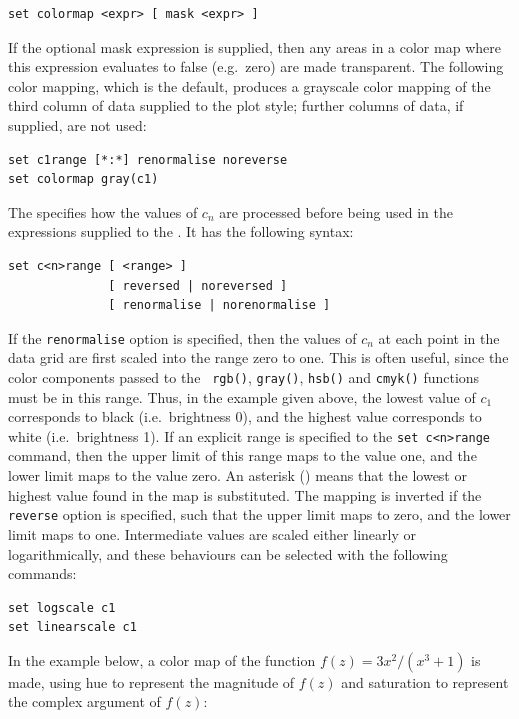 \begin{verbatim}
set colormap <expr> [ mask <expr> ]
\end{verbatim}

\noindent If the optional mask expression is supplied, then any areas in a
color map where this expression evaluates to false (e.g.\ zero) are made
transparent. The following color mapping, which is the default, produces a
grayscale color mapping of the third column of data supplied to the
 plot style; further columns of data, if supplied, are not
used:

\begin{verbatim}
set c1range [*:*] renormalise noreverse
set colormap gray(c1)
\end{verbatim}

The  specifies how the values of $c_n$ are
processed before being used in the expressions supplied to the . It has the following syntax:

\begin{verbatim}
set c<n>range [ <range> ]
              [ reversed | noreversed ]
              [ renormalise | norenormalise ]
\end{verbatim}

\noindent If the {\tt renor\-malise} option is specified, then the values of
$c_n$ at each point in the data grid are first scaled into the range zero to
one. This is often useful, since the color components passed to the {\tt
rgb()}, {\tt gray()}, {\tt hsb()} and {\tt cmyk()} functions must be in this
range.  Thus, in the example given above, the lowest value of $c_1$ corresponds
to black (i.e.\ brightness 0), and the highest value corresponds to white
(i.e.\ brightness 1). If an explicit range is specified to the {\tt set
c<n>range} command, then the upper limit of this range maps to the value one,
and the lower limit maps to the value zero. An asterisk ({\tt *}) means that
the lowest or highest value found in the map is substituted. The mapping is
inverted if the {\tt reverse} option is specified, such that the upper limit
maps to zero, and the lower limit maps to one.  Intermediate values are scaled
either linearly or logarithmically, and these behaviours can be selected with
the following commands:
\begin{verbatim}
set logscale c1
set linearscale c1
\end{verbatim}

In the example below, a color map of the function $f(z)=3x^2/(x^3+1)$ is made,
using hue to represent the magnitude of $f(z)$ and saturation to represent the
complex argument of $f(z)$:


